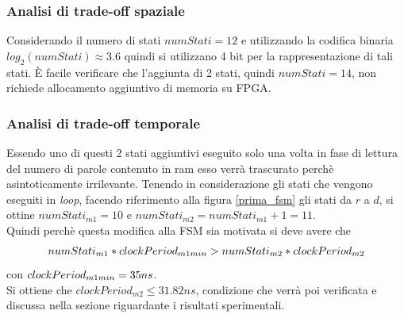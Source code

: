\documentclass[11pt,a4paper]{article}
\begin{document}
            \subsubsection{Analisi di trade-off spaziale}
                Considerando il numero di stati $numStati = 12$ e utilizzando la codifica binaria $log_2(numStati) \approx 3.6$ quindi si utilizzano 4 bit per la rappresentazione di tali stati. È facile verificare che l'aggiunta di 2 stati, quindi $numStati = 14$, non richiede allocamento aggiuntivo di memoria su FPGA.
            \subsubsection{Analisi di trade-off temporale} \label{cap:tradeoff_temporale}
                Essendo uno di questi 2 stati aggiuntivi eseguito solo una volta in fase di lettura del numero di parole contenuto in ram esso verrà trascurato perchè asintoticamente irrilevante. Tenendo in considerazione gli stati che vengono eseguiti in \textit{loop}, facendo riferimento alla figura \ref{prima_fsm} gli stati da $r$ a $d$, si ottine $numStati_{m1} = 10$ e $numStati_{m2} =numStati_{m1} + 1= 11$.\\
                Quindi perchè questa modifica alla FSM sia motivata si deve avere che 
                \begin{gather*}
                    numStati_{m1} * clockPeriod_{m1 \space min} > numStati_{m2} * clockPeriod_{m2} 
                \end{gather*}
                con $clockPeriod_{m1 \space min} = 35 ns$.\\
                Si ottiene che $clockPeriod_{m2} \leq 31.82 ns$, condizione che verrà poi verificata e discussa nella sezione riguardante i risultati sperimentali.
\end{document}
